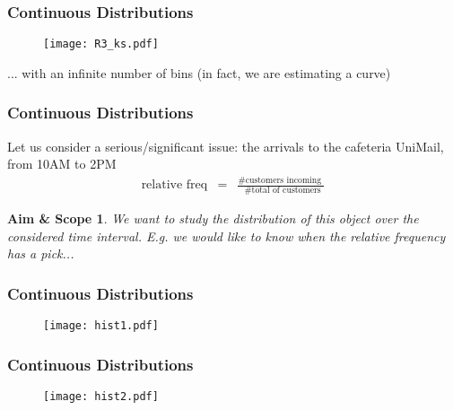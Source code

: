 \documentclass[notes=show,smaller,handout]{beamer}\usepackage[]{graphicx}\usepackage[]{color}
\newtheorem{aes}{Aim \& Scope}[section]
\begin{document}
\begin{frame}
\frametitle{Continuous Distributions}

\begin{example}[cont'd]
\begin{figure}[ptb]\centering
\texttt{[image: R3\_ks.pdf]}
\end{figure}
... with an infinite number of bins (in fact, we are estimating a curve)
\end{example}
\end{frame}


\begin{frame}%

\frametitle{Continuous Distributions}

\begin{example}[Cafeteria]
Let us consider a serious/significant issue: the arrivals to the cafeteria UniMail, from 10AM to 2PM
\begin{eqnarray*}
\mbox{relative freq}&=& \frac{\mbox{\# customers incoming }}{\mbox{ \# total of customers}}
\end{eqnarray*}

\begin{aes}
We want to study the distribution of this object over the considered time interval. E.g. we would like to know when the relative frequency has a pick...
\end{aes}

\end{example}
\end{frame}

\begin{frame}%

\frametitle{Continuous Distributions}
\begin{example}[cont'd]
\begin{figure}[ptb]\centering
\texttt{[image: hist1.pdf]}
\end{figure}
\end{example}
\end{frame}

\begin{frame}%

\frametitle{Continuous Distributions}
\begin{example}[cont'd]
\begin{figure}[ptb]\centering
\texttt{[image: hist2.pdf]}
\end{figure}
\end{example}
\end{frame}
\end{document}
